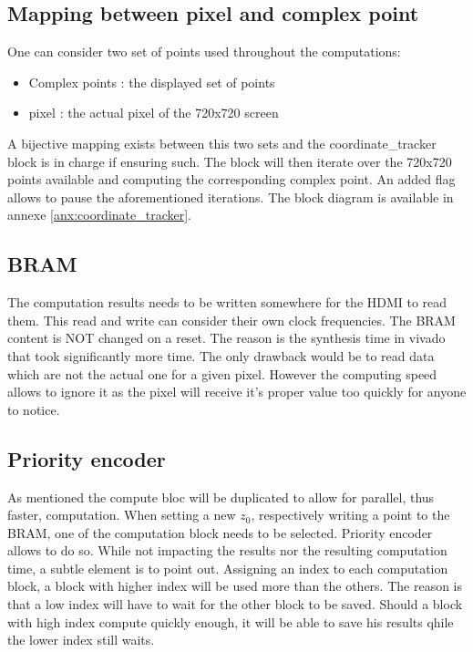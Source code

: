     \subsection{Mapping between pixel and complex point}
        One can consider two set of points used throughout the computations:
        \begin{itemize}
            \item Complex points : the displayed set of points
            \item pixel : the actual pixel of the 720x720 screen
        \end{itemize}
        A bijective mapping exists between this two sets and the coordinate\_tracker block is in charge if ensuring such.
        The block will then iterate over the 720x720 points available and computing the corresponding complex point.
        An added flag allows to pause the aforementioned iterations.
        The block diagram is available in annexe \ref{anx:coordinate_tracker}.
    \subsection{BRAM}
        The computation results needs to be written somewhere for the HDMI to read them.
        This read and write can consider their own clock frequencies.
        The BRAM content is NOT changed on a reset.
        The reason is the synthesis time in vivado that took significantly more time.
        The only drawback would be to read data which are not the actual one for a given pixel.
        However the computing speed allows to ignore it as the pixel will receive it's proper value too quickly for
        anyone to notice.
    \subsection{Priority encoder}
        As mentioned the compute bloc will be duplicated to allow for parallel, thus faster, computation.
        When setting a new $z_0$, respectively writing a point to the BRAM, one of the computation block needs to be
        selected.
        Priority encoder allows to do so.
        While not impacting the results nor the resulting computation time, a subtle element is to point out.
        Assigning an index to each computation block, a block with higher index will be used more than the others.
        The reason is that a low index will have to wait for the other block to be saved.
        Should a block with high index compute quickly enough, it will be able to save his results qhile the lower
        index still waits.
